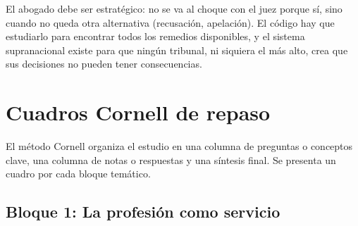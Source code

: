 \documentclass[12pt,oneside]{book}
\begin{document}

\begin{important}
El abogado debe ser estratégico: no se va al choque con el juez porque sí, sino cuando no queda otra alternativa (recusación, apelación). El código hay que estudiarlo para encontrar todos los remedios disponibles, y el sistema supranacional existe para que ningún tribunal, ni siquiera el más alto, crea que sus decisiones no pueden tener consecuencias.
\end{important}

\chapter{Cuadros Cornell de repaso}

El método Cornell organiza el estudio en una columna de preguntas o conceptos clave, una columna de notas o respuestas y una síntesis final. Se presenta un cuadro por cada bloque temático.

\section{Bloque 1: La profesión como servicio}
\end{document}
